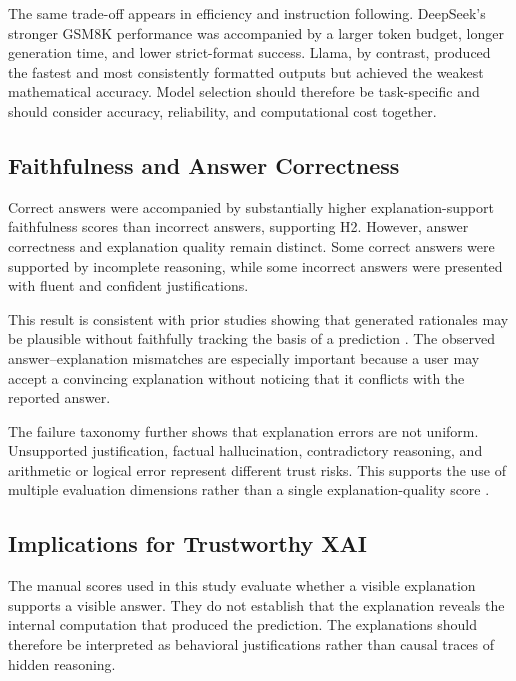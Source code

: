 \documentclass{article}
\begin{document}
The same trade-off appears in efficiency and instruction following.
DeepSeek's stronger GSM8K performance was accompanied by a larger token
budget, longer generation time, and lower strict-format success. Llama,
by contrast, produced the fastest and most consistently formatted
outputs but achieved the weakest mathematical accuracy. Model selection
should therefore be task-specific and should consider accuracy,
reliability, and computational cost together.

\subsection{Faithfulness and Answer Correctness}

Correct answers were accompanied by substantially higher
explanation-support faithfulness scores than incorrect answers, supporting
H2. However, answer correctness and explanation quality remain distinct.
Some correct answers were supported by incomplete reasoning, while some
incorrect answers were presented with fluent and confident
justifications.

This result is consistent with prior studies showing that generated
rationales may be plausible without faithfully tracking the basis of a
prediction
\cite{turpin2023language,lanham2023measuring,
madsen2024selfexplanations,paul2024making,matton2025walk}.
The observed answer--explanation mismatches are especially important
because a user may accept a convincing explanation without noticing that
it conflicts with the reported answer.

The failure taxonomy further shows that explanation errors are not
uniform. Unsupported justification, factual hallucination, contradictory
reasoning, and arithmetic or logical error represent different trust
risks. This supports the use of multiple evaluation dimensions rather
than a single explanation-quality score
\cite{manakul2023selfcheckgpt,farquhar2024semantic,
siegel2024probabilities,terentowicz2025unfaithful}.

\subsection{Implications for Trustworthy XAI}

The manual scores used in this study evaluate whether a visible
explanation supports a visible answer. They do not establish that the
explanation reveals the internal computation that produced the
prediction. The explanations should therefore be interpreted as
behavioral justifications rather than causal traces of hidden reasoning.
\end{document}
